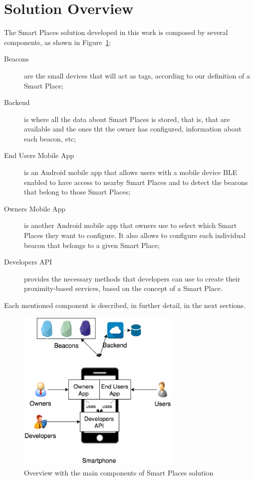 \section{Solution Overview}
\label{sec:solution_solution_overview}
The Smart Places solution developed in this work is composed by several components, as shown in Figure~\ref{fig:solution_overview}:
\begin{description}
  \item[Beacons]
  are the small devices that will act as tags, according to our definition of a Smart Place;
  \item[Backend]
  is where all the data about Smart Places is stored, that is, that are available and the ones tht the owner has configured, information about each beacon, etc;
  \item[End Users Mobile App]
  is an Android mobile app that allows users with a mobile device \gls{BLE} enabled to have access to nearby Smart Places and to detect the beacons that belong to those Smart Places;
  \item[Owners Mobile App] is another Android mobile app that owners use to select which Smart Places they want to configure. It also allows to configure each individual beacon that belongs to a given Smart Place;
  \item[Developers \gls{API}] provides the necessary methods that developers can use to create their proximity-based services, based on the concept of a Smart Place.
\end{description}
Each mentioned component is described, in further detail, in the next sections.

\begin{figure}[!ht]
  \centering
    \includegraphics[width=0.7\textwidth, keepaspectratio]{images/smart_places_solution_overview}
    \caption[Solution Overview]{Overview with the main components of Smart Places solution}
    \label{fig:solution_overview}
\end{figure}

